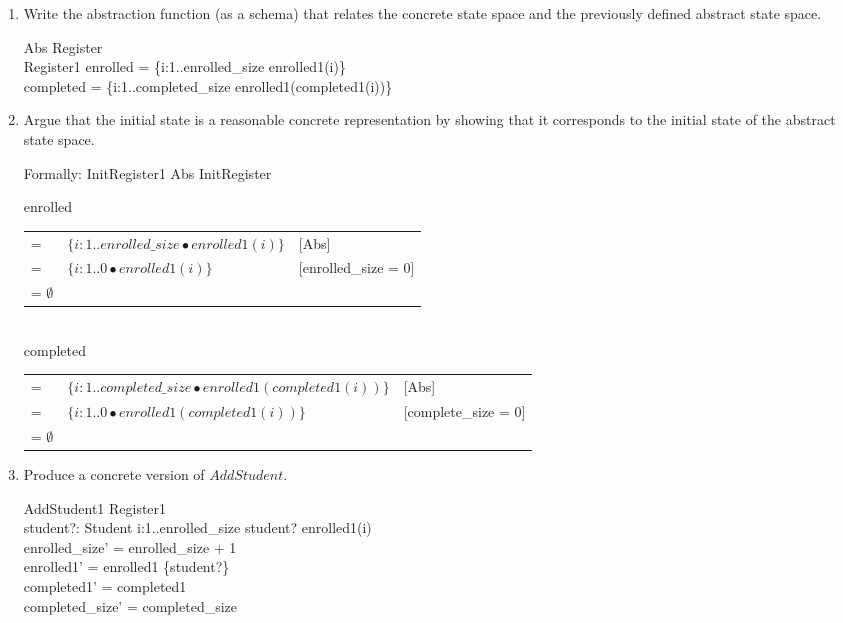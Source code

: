 \documentclass{article}
\begin{document}
\begin{enumerate}
\begin{schema}{InitRegister1}
  \where
      enrolled1: \emptyset \\
    completed1: \emptyset \\
    enrolled\_size: 0 \\
    completed\_size: 0 
  \end{schema}
  \color{black}  
\item Write the abstraction function (as a schema) that
relates the concrete state space and the previously defined abstract state
space.
\color{blue}
  \begin{schema}{Abs}
    Register \\
    Register1
  \where
    enrolled = \{i:1..enrolled\_size \bullet enrolled1(i)\} \\
    completed = \{i:1..completed\_size \bullet enrolled1(completed1(i))\}
  \end{schema}
  \color{black}  

\item Argue that the initial state is a reasonable concrete
representation by showing that it corresponds to the initial state
of the abstract state space.\\
\color{blue}
\begin{zed}
Formally: InitRegister1 \land Abs \vdash InitRegister 
\end{zed}

enrolled \\
\begin{tabular}{lll}
=     & $\{i:1..enrolled\_size \bullet enrolled1(i)\}$   & [Abs] \\ 
=     & $\{i:1..0 \bullet enrolled1(i)\}$   & [enrolled\_size = 0] \\
= $\emptyset$ &  & \\
\end{tabular}
\\
completed \\
\begin{tabular}{lll}
=     & $\{i:1..completed\_size \bullet enrolled1(completed1(i))\}$   & [Abs] \\ 
=     & $\{i:1..0 \bullet enrolled1(completed1(i))\}$ & [complete\_size = 0] \\
= $\emptyset$ &  & \\
\end{tabular}
\color{black}

\item Produce a concrete version of $AddStudent$. \\
  \color{blue}
  \begin{schema}{AddStudent1}
    \Delta Register1 \\
    student?: Student
    \where
    \forall i:1..enrolled\_size \bullet student? \neq enrolled1(i) \\
    enrolled\_size' = enrolled\_size + 1 \\
    enrolled1' = enrolled1 \oplus \{student?\} \\
    completed1' = completed1 \\
    completed\_size' = completed\_size
  \end{schema}
  \color{black}


\end{enumerate}
\end{document}

